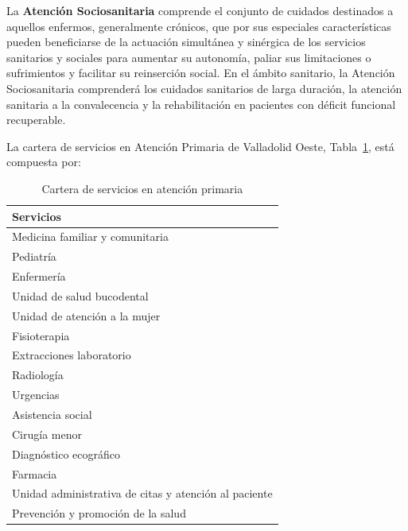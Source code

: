 La \textbf{Atención Sociosanitaria} comprende el conjunto de cuidados destinados a aquellos enfermos, generalmente crónicos, que por sus especiales características pueden beneficiarse de la actuación simultánea y sinérgica de los servicios sanitarios y sociales para aumentar su autonomía, paliar sus limitaciones o sufrimientos y facilitar su reinserción social.
En el ámbito sanitario, la Atención Sociosanitaria comprenderá los cuidados sanitarios de larga duración, la atención sanitaria a la convalecencia y la rehabilitación en pacientes con déficit funcional recuperable.

La cartera de servicios en Atención Primaria de Valladolid Oeste, Tabla~\ref{tab:cartera-servicios}, está compuesta por:

\begin{table}[H]
    \centering
    \begin{tabular}{l}
        \toprule
        Servicios                                             \\
        \midrule
        Medicina familiar y comunitaria                       \\
        Pediatría                                             \\
        Enfermería                                            \\
        Unidad de salud bucodental                            \\
        Unidad de atención a la mujer                         \\
        Fisioterapia                                          \\
        Extracciones laboratorio                              \\
        Radiología                                            \\
        Urgencias                                             \\
        Asistencia social                                     \\
        Cirugía menor                                         \\
        Diagnóstico ecográfico                                \\
        Farmacia                                              \\
        Unidad administrativa de citas y atención al paciente \\
        Prevención y promoción de la salud                    \\
        \bottomrule
    \end{tabular}
    \caption{Cartera de servicios en atención primaria}
    \label{tab:cartera-servicios}
\end{table}

